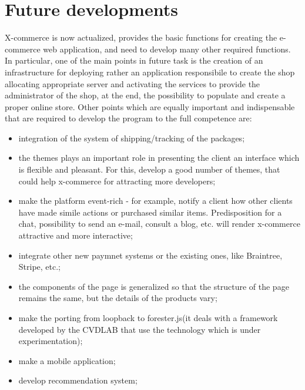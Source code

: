 \section{Future developments}
\label{sec:future_work}
X-commerce is now actualized, provides the basic functions for creating the e-commerce web application, and need to develop many other required functions.
In particular, one of the main points in future task is the creation of an infrastructure for deploying rather an application responsibile to create the shop allocating appropriate server and activating the services to provide the administrator of the shop, at the end, the possibility to populate and create a proper online store.
\newline
Other points which are equally important and indispensable that are required to develop the program to the full competence are:
\begin{itemize}
\item integration of the system of shipping/tracking of the packages;
\item the themes plays an important role in presenting the client an interface which is flexible and pleasant. For this, develop a good number of themes, that could help x-commerce for attracting more developers;
\item make the platform event-rich - for example, notify a client how other clients have made simile actions or purchased similar items. Predisposition for a chat, possibility to send an e-mail, consult a blog, etc. will render x-commerce attractive and more interactive;
\item integrate other new paymnet systems or the existing ones, like Braintree, Stripe, etc.;
\item the components of the page is generalized so that the structure of the page remains the same, but the details of the products vary;
\item make the porting from loopback to forester.js(it deals with a framework developed by the CVDLAB that use the technology which is under experimentation);
\item make a mobile application;
\item develop recommendation system;
\end{itemize}